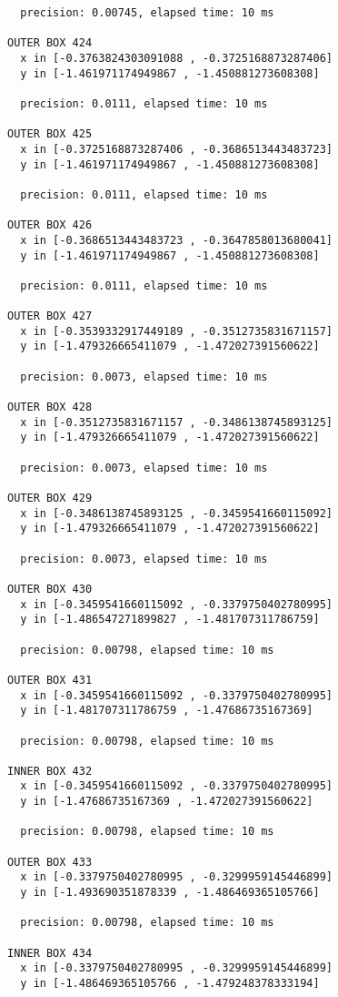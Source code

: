 \begin{verbatim}
  precision: 0.00745, elapsed time: 10 ms

OUTER BOX 424
  x in [-0.3763824303091088 , -0.3725168873287406]
  y in [-1.461971174949867 , -1.450881273608308]

  precision: 0.0111, elapsed time: 10 ms

OUTER BOX 425
  x in [-0.3725168873287406 , -0.3686513443483723]
  y in [-1.461971174949867 , -1.450881273608308]

  precision: 0.0111, elapsed time: 10 ms

OUTER BOX 426
  x in [-0.3686513443483723 , -0.3647858013680041]
  y in [-1.461971174949867 , -1.450881273608308]

  precision: 0.0111, elapsed time: 10 ms

OUTER BOX 427
  x in [-0.3539332917449189 , -0.3512735831671157]
  y in [-1.479326665411079 , -1.472027391560622]

  precision: 0.0073, elapsed time: 10 ms

OUTER BOX 428
  x in [-0.3512735831671157 , -0.3486138745893125]
  y in [-1.479326665411079 , -1.472027391560622]

  precision: 0.0073, elapsed time: 10 ms

OUTER BOX 429
  x in [-0.3486138745893125 , -0.3459541660115092]
  y in [-1.479326665411079 , -1.472027391560622]

  precision: 0.0073, elapsed time: 10 ms

OUTER BOX 430
  x in [-0.3459541660115092 , -0.3379750402780995]
  y in [-1.486547271899827 , -1.481707311786759]

  precision: 0.00798, elapsed time: 10 ms

OUTER BOX 431
  x in [-0.3459541660115092 , -0.3379750402780995]
  y in [-1.481707311786759 , -1.47686735167369]

  precision: 0.00798, elapsed time: 10 ms

INNER BOX 432
  x in [-0.3459541660115092 , -0.3379750402780995]
  y in [-1.47686735167369 , -1.472027391560622]

  precision: 0.00798, elapsed time: 10 ms

OUTER BOX 433
  x in [-0.3379750402780995 , -0.3299959145446899]
  y in [-1.493690351878339 , -1.486469365105766]

  precision: 0.00798, elapsed time: 10 ms

INNER BOX 434
  x in [-0.3379750402780995 , -0.3299959145446899]
  y in [-1.486469365105766 , -1.479248378333194]


\end{verbatim}
